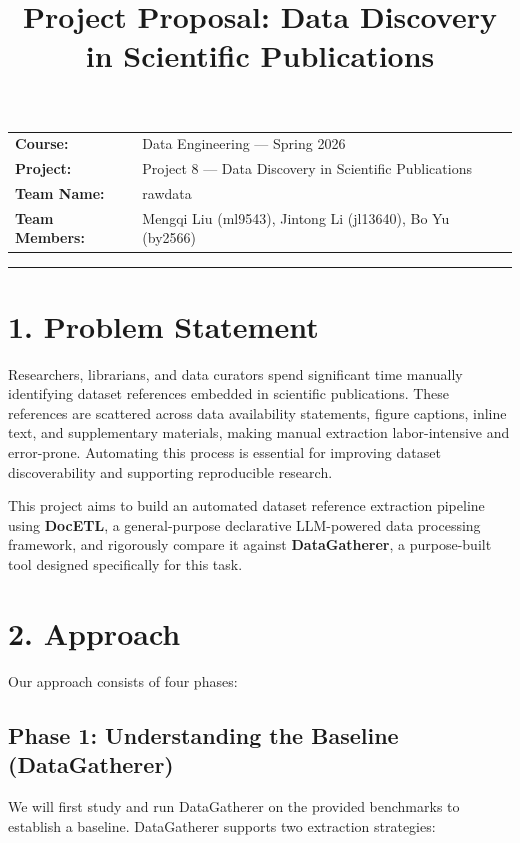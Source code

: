 \documentclass[11pt]{article}
\title{\textbf{Project Proposal: Data Discovery in Scientific Publications}}
\author{}
\date{}
\begin{document}
\maketitle
\vspace{-2em}

\begin{tabular}{@{}ll}
\textbf{Course:} & Data Engineering --- Spring 2026 \\
\textbf{Project:} & Project 8 --- Data Discovery in Scientific Publications \\
\textbf{Team Name:} & rawdata \\
\textbf{Team Members:} & Mengqi Liu (ml9543), Jintong Li (jl13640), Bo Yu (by2566) \\
\end{tabular}

\vspace{1em}
\hrule
\vspace{1em}

\section{1. Problem Statement}

Researchers, librarians, and data curators spend significant time manually identifying dataset references embedded in scientific publications. These references are scattered across data availability statements, figure captions, inline text, and supplementary materials, making manual extraction labor-intensive and error-prone. Automating this process is essential for improving dataset discoverability and supporting reproducible research.

This project aims to build an automated dataset reference extraction pipeline using \textbf{DocETL}, a general-purpose declarative LLM-powered data processing framework, and rigorously compare it against \textbf{DataGatherer}, a purpose-built tool designed specifically for this task.

\section{2. Approach}

Our approach consists of four phases:

\subsection{Phase 1: Understanding the Baseline (DataGatherer)}

We will first study and run DataGatherer on the provided benchmarks to establish a baseline. DataGatherer supports two extraction strategies:
\end{document}
